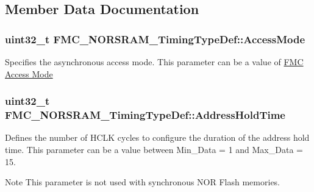 \subsection{Member Data Documentation}
\subsubsection[{\texorpdfstring{Access\+Mode}{AccessMode}}]{\setlength{\rightskip}{0pt plus 5cm}uint32\+\_\+t F\+M\+C\+\_\+\+N\+O\+R\+S\+R\+A\+M\+\_\+\+Timing\+Type\+Def\+::\+Access\+Mode}\hypertarget{struct_f_m_c___n_o_r_s_r_a_m___timing_type_def_a749d0d44b1fd4e711b0a6897edc3ccfc}{}\label{struct_f_m_c___n_o_r_s_r_a_m___timing_type_def_a749d0d44b1fd4e711b0a6897edc3ccfc}
Specifies the asynchronous access mode. This parameter can be a value of \hyperlink{group___f_m_c___access___mode}{F\+MC Access Mode} 
\subsubsection[{\texorpdfstring{Address\+Hold\+Time}{AddressHoldTime}}]{\setlength{\rightskip}{0pt plus 5cm}uint32\+\_\+t F\+M\+C\+\_\+\+N\+O\+R\+S\+R\+A\+M\+\_\+\+Timing\+Type\+Def\+::\+Address\+Hold\+Time}\hypertarget{struct_f_m_c___n_o_r_s_r_a_m___timing_type_def_a93fe36daa1ceddc36ea168542dcdd010}{}\label{struct_f_m_c___n_o_r_s_r_a_m___timing_type_def_a93fe36daa1ceddc36ea168542dcdd010}
Defines the number of H\+C\+LK cycles to configure the duration of the address hold time. This parameter can be a value between Min\+\_\+\+Data = 1 and Max\+\_\+\+Data = 15. \begin{DoxyNote}{Note}
This parameter is not used with synchronous N\+OR Flash memories. 
\end{DoxyNote}
